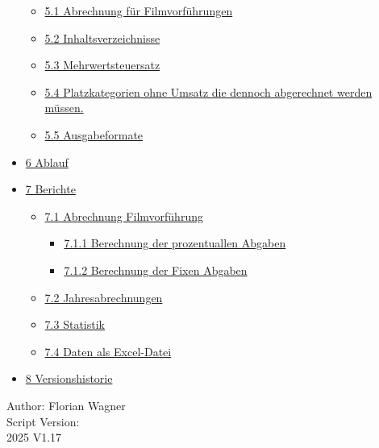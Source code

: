 \documentclass[
]{article}
\providecommand{\tightlist}{%
  \setlength{\itemsep}{0pt}\setlength{\parskip}{0pt}}
\begin{document}
\begin{itemize}
  \begin{itemize}
  \tightlist
  \item
    \hyperref[A_5.1_Abrechnungux5cux2520fuxfcrux5cux2520Filmvorfuxfchrungen]{5.1
    Abrechnung für Filmvorführungen}
  \item
    \hyperref[A_5.2_Inhaltsverzeichnisse]{5.2 Inhaltsverzeichnisse}
  \item
    \hyperref[A_5.3_Mehrwertsteuersatz]{5.3 Mehrwertsteuersatz}
  \item
    \hyperref[A_5.4_Platzkategorienux5cux2520ohneux5cux2520Umsatzux5cux2520dieux5cux2520dennochux5cux2520abgerechnetux5cux2520werdenux5cux2520muxfcssen.]{5.4
    Platzkategorien ohne Umsatz die dennoch abgerechnet werden müssen.}
  \item
    \hyperref[A_5.5_Ausgabeformate]{5.5 Ausgabeformate}
  \end{itemize}
\item
  \hyperref[A_6_Ablauf]{6 Ablauf}
\item
  \hyperref[A_7_Berichte]{7 Berichte}

  \begin{itemize}
  \tightlist
  \item
    \hyperref[A_7.1_Abrechnungux5cux2520Filmvorfuxfchrung]{7.1
    Abrechnung Filmvorführung}

    \begin{itemize}
    \tightlist
    \item
      \hyperref[A_7.1.1_Berechnungux5cux2520derux5cux2520prozentuallenux5cux2520Abgaben]{7.1.1
      Berechnung der prozentuallen Abgaben}
    \item
      \hyperref[A_7.1.2_Berechnungux5cux2520derux5cux2520Fixenux5cux2520Abgaben]{7.1.2
      Berechnung der Fixen Abgaben}
    \end{itemize}
  \item
    \hyperref[A_7.2_Jahresabrechnungen]{7.2 Jahresabrechnungen}
  \item
    \hyperref[A_7.3_Statistik]{7.3 Statistik}
  \item
    \hyperref[A_7.4_Datenux5cux2520alsux5cux2520Excel-Datei]{7.4 Daten
    als Excel-Datei}
  \end{itemize}
\item
  \hyperref[A_8_Versionshistorie]{8 Versionshistorie}
\end{itemize}

Author: Florian Wagner\\
Script Version:\\
2025 V1.17
\end{document}
